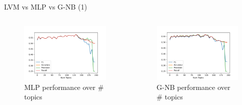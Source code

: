 \documentclass[aspectratio=169,xcolor=dvipsnames]{beamer}
\begin{document}
\begin{frame}{LVM vs MLP vs G-NB (1)}
    \vspace*{-10mm}
    \begin{columns}
        \hspace{-5mm}
        \begin{column}{.7\textwidth}
            \begin{figure}
                \centering
                \includegraphics[width=.9\linewidth]{images/summary_mlp.pdf}
                \caption{MLP performance over \# topics}
                \label{fig:mlp}
            \end{figure}
        \end{column}
        \hspace*{-2cm}
       \begin{column}{.7\textwidth}
            \begin{figure}
                \centering
                \includegraphics[width=.9\linewidth]{images/summary_g-nb.pdf}
                \caption{G-NB performance over \# topics}
                \label{fig:gnb}
            \end{figure}
        \end{column}
    \end{columns}
\end{frame}
\end{document}
